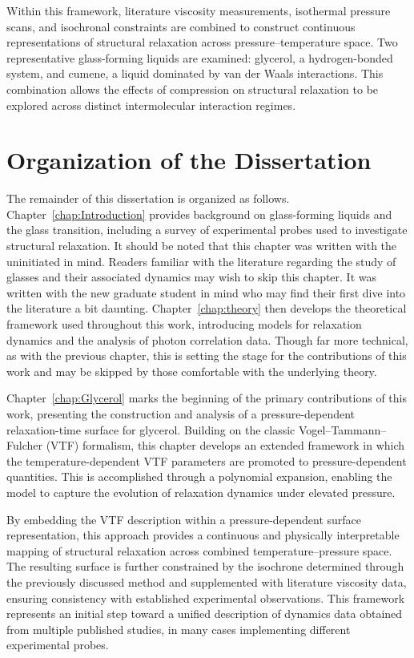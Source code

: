 Within this framework, literature viscosity measurements, isothermal pressure scans, and isochronal constraints are combined to construct continuous representations of structural relaxation across pressure--temperature space. Two representative glass-forming liquids are examined: glycerol, a hydrogen-bonded system, and cumene, a liquid dominated by van der Waals interactions. This combination allows the effects of compression on structural relaxation to be explored across distinct intermolecular interaction regimes.

\section{Organization of the Dissertation}

The remainder of this dissertation is organized as follows. Chapter~\ref{chap:Introduction} provides background on glass-forming liquids and the glass transition, including a survey of experimental probes used to investigate structural relaxation. It should be noted that this chapter was written with the uninitiated in mind.  Readers familiar with the literature regarding the study of glasses and their associated dynamics may wish to skip this chapter.  It was written with the new graduate student in mind who may find their first dive into the literature a bit daunting. Chapter~\ref{chap:theory} then develops the theoretical framework used throughout this work, introducing models for relaxation dynamics and the analysis of photon correlation data.  Though far more technical, as with the previous chapter, this is setting the stage for the contributions of this work and may be skipped by those comfortable with the underlying theory.

Chapter~\ref{chap:Glycerol} marks the beginning of the primary contributions of this work, presenting the construction and analysis of a pressure-dependent relaxation-time surface for glycerol. Building on the classic Vogel--Tammann--Fulcher (VTF) formalism, this chapter develops an extended framework in which the temperature-dependent VTF parameters are promoted to pressure-dependent quantities. This is accomplished through a polynomial expansion, enabling the model to capture the evolution of relaxation dynamics under elevated pressure.

By embedding the VTF description within a pressure-dependent surface representation, this approach provides a continuous and physically interpretable mapping of structural relaxation across combined temperature--pressure space. The resulting surface is further constrained by the isochrone determined through the previously discussed \tgp method and supplemented with literature viscosity data, ensuring consistency with established experimental observations. This framework represents an initial step toward a unified description of dynamics data obtained from multiple published studies, in many cases implementing different experimental probes.

